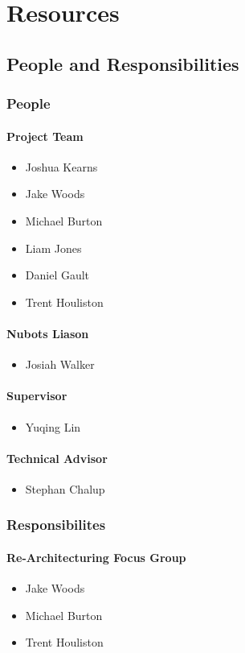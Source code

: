 \documentclass[a4paper]{article}
\begin{document}
	\section{Resources}
		\subsection{People and Responsibilities}
			\subsubsection{People}
				\paragraph{Project Team}
					\begin{itemize}
						\item Joshua Kearns
						\item Jake Woods
						\item Michael Burton
						\item Liam Jones
						\item Daniel Gault
						\item Trent Houliston
					\end{itemize}
				\paragraph{Nubots Liason}
					\begin{itemize}
						\item Josiah Walker
					\end{itemize}
				\paragraph{Supervisor}
					\begin{itemize}
						\item Yuqing Lin
					\end{itemize}
				\paragraph{Technical Advisor}
					\begin{itemize}
						\item Stephan Chalup
					\end{itemize}
			\subsubsection{Responsibilites}
				\paragraph{Re-Architecturing Focus Group}
					\begin{itemize}
						\item Jake Woods
						\item Michael Burton
						\item Trent Houliston
					\end{itemize}
\end{document}
